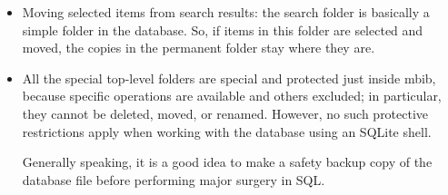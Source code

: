\documentclass[10pt]{article}
\begin{document}
\begin{itemize}


\item Moving selected items from search results: the search folder is basically a simple folder in the database. So, if items in this folder are selected and moved, the copies in the permanent folder stay where they are. 


\item All the special top-level folders are special and protected just inside mbib, because specific operations are available and others excluded; in particular, they cannot be deleted, moved, or renamed. However, no such protective restrictions apply when working with the database using an SQLite shell. 

Generally speaking, it is a good idea to make a safety backup copy of the database file before performing major surgery in SQL. 
\end{itemize}
\end{document}
